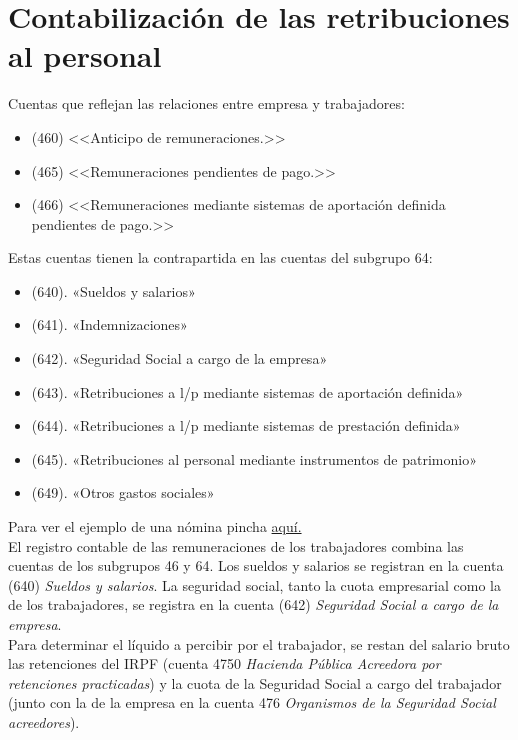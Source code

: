 \documentclass[a4paper,12pt]{article}
\begin{document}
\newpage
\section{Contabilización de las retribuciones al personal}

Cuentas que reflejan las relaciones entre empresa y trabajadores:
\begin{itemize}
    \item (460) <<Anticipo de remuneraciones.>>
    \item (465) <<Remuneraciones pendientes de pago.>>
    \item (466) <<Remuneraciones mediante sistemas de aportación definida pendientes de pago.>>
\end{itemize}

Estas cuentas tienen la contrapartida en las cuentas del subgrupo 64:
\begin{itemize}
    \item (640). «Sueldos y salarios»
    \item (641). «Indemnizaciones»
    \item (642). «Seguridad Social a cargo de la empresa»
    \item (643). «Retribuciones a l/p mediante sistemas de aportación definida»
    \item (644). «Retribuciones a l/p mediante sistemas de prestación definida»
    \item (645). «Retribuciones al personal mediante instrumentos de patrimonio»
    \item (649). «Otros gastos sociales»
\end{itemize}

Para ver el ejemplo de una nómina pincha \href{https://github.com/ElblogdeIsmael/ElblogdeIsmael.github.io/blob/main/Asignaturas/Tercer%20A%C3%B1o/CF1/Resumenes/Tema4/FCCEE/images/partes_nomina.png}{aquí.}\\

\newpage
El registro contable de las remuneraciones de los trabajadores combina las cuentas de los subgrupos 46 y 64. Los sueldos y salarios se registran en la cuenta (640) \textit{Sueldos y salarios}. La seguridad social, tanto la cuota empresarial como la de los trabajadores, se registra en la cuenta (642) \textit{Seguridad Social a cargo de la empresa}.\\

Para determinar el líquido a percibir por el trabajador, se restan del salario bruto las retenciones del IRPF (cuenta 4750 \textit{Hacienda Pública Acreedora por retenciones practicadas}) y la cuota de la Seguridad Social a cargo del trabajador (junto con la de la empresa en la cuenta 476 \textit{Organismos de la Seguridad Social acreedores}).\\
\end{document}
